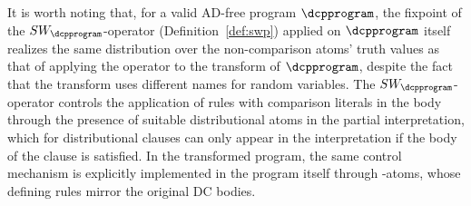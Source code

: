 It is worth noting that, for a valid AD-free program $\dcpprogram$, the fixpoint of  the $SW_\dcpprogram$-operator (Definition~\ref{def:swp}) applied on $\dcpprogram$ itself realizes the same distribution over the non-comparison atoms' truth values as that of applying the operator to the transform of $\dcpprogram$, despite the fact that the transform uses different names for random variables. The $SW_\dcpprogram$-operator controls the application of rules with comparison literals in the body through the presence of suitable distributional atoms in the partial interpretation, which for distributional clauses can only appear in the interpretation if the body of the clause is satisfied. In the transformed program, the same control mechanism is explicitly implemented in the program itself through -atoms, whose defining rules mirror the original DC bodies.

